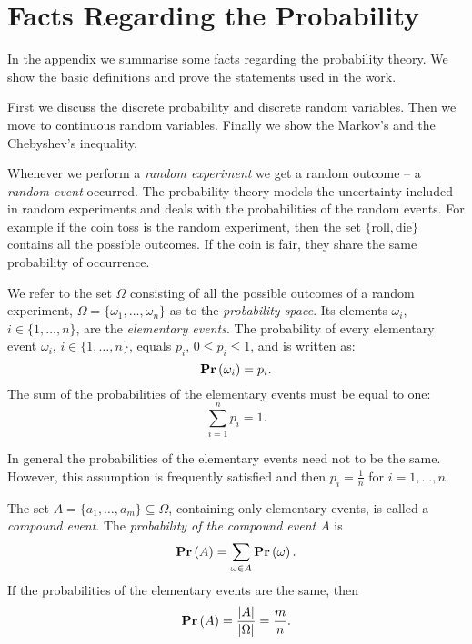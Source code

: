 \chapter{Facts Regarding the Probability}
In the appendix we summarise some facts regarding the probability theory. We show the basic definitions and prove the statements used in the work.

First we discuss the discrete probability and discrete random variables. Then we move to continuous random variables. Finally we show the Markov's and the Chebyshev's inequality.

Whenever we perform a \emph{random experiment} we get a random outcome -- a \emph{random event} occurred. The probability theory models the uncertainty included in random experiments and deals with the probabilities of the random events. For example if the coin toss is the random experiment, then the set $\{\text{roll}, \text{die}\}$ contains all the possible outcomes. If the coin is fair, they share the same probability of occurrence.

\begin{definition}
We refer to the set $\Omega$ consisting of all the possible outcomes of a random experiment, $\Omega = \{ \omega_1, \dots, \omega_n \}$ as to the \emph{probability space}. Its elements $\omega_i$, $i \in \{1, \dots, n\}$, are the \emph{elementary events}. The probability of every elementary event $\omega_i$, $i \in \{1, \dots, n\}$, equals $p_i$, $0 \leq p_i \leq 1$, and is written as: \[ \mathbf{Pr}\left(\omega_i\right) = p_i \text{.} \] The sum of the probabilities of the elementary events must be equal to one:
\[
\displaystyle\sum_{i = 1}^{n} p_i = 1 \text{.}
\]
\end{definition}

In general the probabilities of the elementary events need not to be the same. However, this assumption is frequently satisfied and then $p_i = \frac{1}{n}$ for $i = 1, \dots, n$.

\begin{definition}
The set $A = \{a_1, \dots, a_m \}\subseteq \Omega$, containing only elementary events, is called a \emph{compound event}. The \emph{probability of the compound event $A$} is \[ \mathbf{Pr}\left(A\right) = \displaystyle\sum_{\omega \in A} \mathbf{Pr}\left(\omega\right) \text{.} \] If the probabilities of the elementary events are the same, then 
\[
	\mathbf{Pr}\left(A\right) = \frac{|A|}{|\Omega|} = \frac{m}{n} \text{.}
\]
\end{definition}

